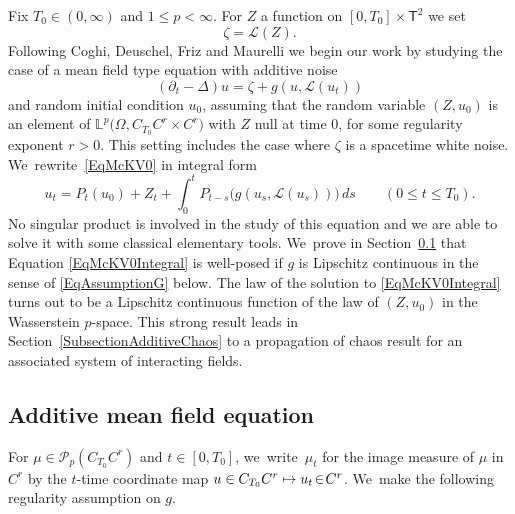 \documentclass[10pt]{amsart}
\newcommand\mto{\mathchoice{\longmapsto}{\mapsto}{\mapsto}{\mapsto}}
\theoremstyle{definition}
\newcommand{\bsfT}{\mathbf{\mathsf{T}}}
\newcommand{\mcL}{\mathcal{L}}
\newcommand{\bbL}{\mathbb{L}}
\begin{document}
Fix $T_0\in(0,\infty)$ and $1\leq p<\infty$. For $Z$ a function on $[0,T_0]\times \bsfT^2$ we set
\[
\zeta = \mathscr{L}(Z).
\]
Following Coghi, Deuschel, Friz and Maurelli \cite{CDFM} we begin our work by studying the case of a mean field type equation with additive noise
\begin{equation} \label{EqMcKV0}
(\partial_t-\Delta)u = \zeta + g(u, \mcL(u_t))
\end{equation}
and random initial condition $u_0$, assuming that the random variable $(Z,u_0)$ is an element of $\bbL^p\bigl(\Omega, C_{T_0}C^r \times C^r\bigr)$ with $Z$ null at time $0$, for some regularity exponent \hbox{$r\!>\!0$}. This setting includes the case where $\zeta$ is a spacetime white noise. We~rewrite~\eqref{EqMcKV0} in integral form
\begin{equation} \label{EqMcKV0Integral}
u_t = P_t(u_0) + Z_t + \int_0^t P_{t-s} \bigl(g(u_s,\mcL(u_s))\bigr) \, ds \qquad (0\leq t\leq T_0).
\end{equation}
No singular product is involved in the study of this equation and we are able to solve it with some classical elementary tools. We~prove in Section~\ref{SubsectionAdditive} that Equation \eqref{EqMcKV0Integral} is well-posed if $g$ is Lipschitz continuous in the sense of \eqref{EqAssumptionG} below. The law of the solution to \eqref{EqMcKV0Integral} turns out to be a Lipschitz continuous function of the law of $(Z,u_0)$ in the Wasserstein $p$-space. This strong result leads in Section~\ref{SubsectionAdditiveChaos} to a propagation of chaos result for an associated system of interacting fields.

\subsection{Additive mean field equation}
\label{SubsectionAdditive}

For $\mu\!\in\!\mathcal{P}_p(C_{T_0}C^r)$ and $t\!\in\![0,T_0]$, we~write~$\mu_t$ for the image measure of $\mu$ in $C^r$ by the $t$-time coordinate map $u\in C_{T_0}C^r\mto u_t \!\in\! C^r$. We~make the following regularity assumption on $g$.
\end{document}

